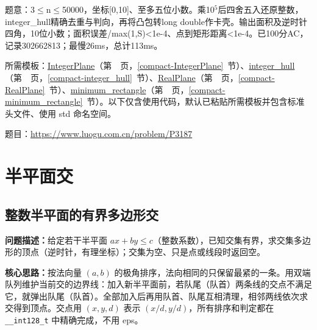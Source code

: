 \label{usage-example-418}

题意：3$\le$n$\le$50000，坐标[0,10]、至多五位小数。乘10$^{5}$后四舍五入还原整数，integer\_hull精确去重与判向，再将凸包转long double作卡壳。输出面积及逆时针四角，10位小数；面积误差/max(1,S)<1e-4、点到矩形距离<1e-4。已100分AC，记录302662813；最慢26ms，总计113ms。

所需模板：\hyperref[compact-IntegerPlane]{IntegerPlane}（第~\pageref{compact-IntegerPlane}~页，\ref{compact-IntegerPlane}~节）、\hyperref[compact-integer_hull]{integer\_\allowbreak{}hull}（第~\pageref{compact-integer_hull}~页，\ref{compact-integer_hull}~节）、\hyperref[compact-RealPlane]{RealPlane}（第~\pageref{compact-RealPlane}~页，\ref{compact-RealPlane}~节）、\hyperref[compact-minimum_rectangle]{minimum\_\allowbreak{}rectangle}（第~\pageref{compact-minimum_rectangle}~页，\ref{compact-minimum_rectangle}~节）。以下仅含使用代码，默认已粘贴所需模板并包含标准头文件、使用 std 命名空间。

题目：\url{https://www.luogu.com.cn/problem/P3187}



\Needspace{180pt}

\chapter{半平面交}

\section{整数半平面的有界多边形交}\label{compact-IntegerHalfplanes}

\noindent\textbf{问题描述：}\allowbreak 给定若干半平面 $ax+by\le c$（整数系数），已知交集有界，求交集多边形的顶点（逆时针，有理坐标）；交集为空、只是点或线段时返回空。

\textbf{核心思路：}\allowbreak 按法向量 $(a,b)$ 的极角排序，法向相同的只保留最紧的一条。用双端队列维护当前交的边界线：加入新半平面前，若队尾（队首）两条线的交点不满足它，就弹出队尾（队首）。全部加入后再用队首、队尾互相清理，相邻两线依次求交得到顶点。交点用 $(x,y,d)$ 表示 $(x/d,y/d)$，所有排序和判定都在 \texttt{\_\_int128\_t} 中精确完成，不用 eps。

